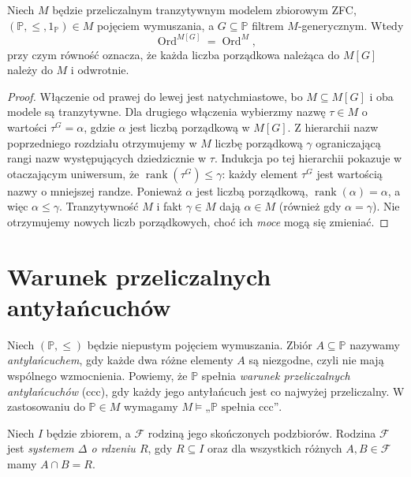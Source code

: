 \begin{lemat}
\label{lem:forcing34-no-ordinals}
Niech $M$ będzie przeliczalnym
tranzytywnym modelem zbiorowym ZFC,
$(\mathbb P,\leq,1_{\mathbb P})\in M$
pojęciem wymuszania, a
$G\subseteq\mathbb P$ filtrem
$M$-generycznym. Wtedy
\[
 \operatorname{Ord}^{M[G]}
   =\operatorname{Ord}^M,
\]
przy czym równość oznacza, że
każda liczba porządkowa należąca
do $M[G]$ należy do $M$ i odwrotnie.
\end{lemat}
\begin{proof}
Włączenie od prawej do lewej jest
natychmiastowe, bo $M\subseteq M[G]$
i oba modele są tranzytywne.
Dla drugiego włączenia wybierzmy
nazwę $\tau\in M$ o wartości
$\tau^G=\alpha$, gdzie $\alpha$
jest liczbą porządkową w $M[G]$.
Z hierarchii nazw poprzedniego
rozdziału otrzymujemy w $M$
liczbę porządkową $\gamma$
ograniczającą rangi nazw
występujących dziedzicznie w $\tau$.
Indukcja po tej hierarchii pokazuje
w otaczającym uniwersum, że
$\operatorname{rank}(\tau^G)\leq\gamma$:
każdy element $\tau^G$ jest wartością
nazwy o mniejszej randze.
Ponieważ $\alpha$ jest liczbą
porządkową, $\operatorname{rank}(\alpha)
=\alpha$, a więc $\alpha\leq\gamma$.
Tranzytywność $M$ i fakt
$\gamma\in M$ dają $\alpha\in M$
(również gdy $\alpha=\gamma$).
Nie otrzymujemy nowych liczb
porządkowych, choć ich \emph{moce}
mogą się zmieniać.
\end{proof}

\section{Warunek przeliczalnych antyłańcuchów}

\begin{definicja}
\label{def:forcing34-ccc}
Niech $(\mathbb P,\leq)$ będzie
niepustym pojęciem wymuszania.
Zbiór $A\subseteq\mathbb P$ nazywamy
\emph{antyłańcuchem}, gdy każde dwa
różne elementy $A$ są niezgodne,
czyli nie mają wspólnego wzmocnienia.
Powiemy, że $\mathbb P$ spełnia
\emph{warunek przeliczalnych
antyłańcuchów} (ccc), gdy każdy
jego antyłańcuch jest co najwyżej
przeliczalny. W zastosowaniu do
$\mathbb P\in M$ wymagamy
$M\models\text{„$\mathbb P$ spełnia ccc”}$.
\end{definicja}

\begin{definicja}
\label{def:forcing34-delta-system}
Niech $I$ będzie zbiorem, a
$\mathcal F$ rodziną jego skończonych
podzbiorów. Rodzina $\mathcal F$
jest \emph{systemem $\Delta$ o rdzeniu $R$},
gdy $R\subseteq I$ oraz dla
wszystkich różnych $A,B\in\mathcal F$
mamy $A\cap B=R$.
\end{definicja}

